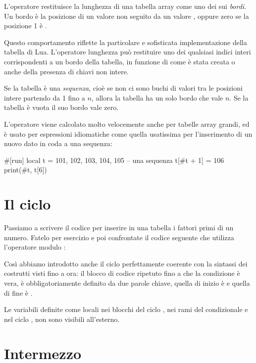 L'operatore \key{\#} restituisce la lunghezza di una tabella array come uno dei
sui \emph{bordi}. Un bordo è la posizione di un valore non  seguito da
un valore , oppure zero se la posizione 1 è .

Questo comportamento riflette la particolare e sofisticata implementazione della
tabella di Lua. L'operatore lunghezza \key{\#} può restituire uno dei
qualsiasi indici interi corrispondenti a un bordo della tabella, in funzione di
come è stata creata o anche della presenza di chiavi non intere.

Se la tabella è una \emph{sequenza}, cioè se non ci sono buchi di valori tra le
posizioni intere partendo da 1 fino a \( n \), allora la tabella ha un solo
bordo che vale \( n \). Se la tabella è vuota il suo bordo vale zero.

L'operatore \key{\#} viene calcolato molto velocemente anche per tabelle array
grandi, ed è usato per espressioni idiomatiche come quella usatissima per
l'inserimento di un nuovo dato in coda a una sequenza:
\begin{lines}
#[run]
local t = {101, 102, 103, 104, 105} -- una sequenza
t[#t + 1] = 106
print(#t, t[6])
\end{lines}


\section{Il ciclo }
\label{secCicloWhile}

Passiamo a scrivere il codice per inserire in una tabella i fattori primi di un
numero. Fatelo per esercizio e poi confrontate il codice seguente che utilizza
l'operatore modulo \key{\%}:

Così abbiamo introdotto anche il ciclo 
perfettamente coerente con la sintassi dei costrutti visti fino a ora: il blocco
di codice ripetuto fino a che la condizione è vera, è obbligatoriamente definito
da due parole chiave, quella di inizio è  e quella di fine è .

Le variabili definite come locali nei blocchi del ciclo , nei rami del
condizionale  e nel ciclo , non sono visibili all'esterno.


\section{Intermezzo}

